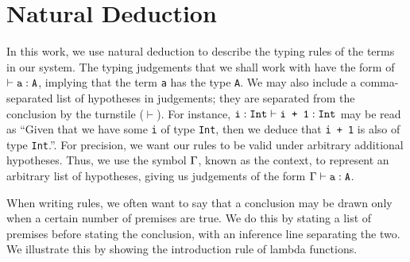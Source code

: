 \documentclass[12pt,twoside,maitrise]{dms}
\theoremstyle{definition}
\numberwithin{equation}{section}
\numberwithin{table}{chapter}
\numberwithin{figure}{chapter}
\newcommand\id[1] {\texttt{#1}}
\begin{document}




\def\bibname{References}






\anglais
\appendix

\chapter{Natural Deduction}\label{app:natural-deduction}

In this work, we use natural deduction to describe the typing rules of the
terms in our system. The typing judgements that we shall work with have the
form of $\vdash \oftype{\id{a}}{\id{A}}$, implying that the term \id{a} has the
type \id{A}. We may also include a comma-separated list of hypotheses in
judgements; they are separated from the conclusion by the turnstile ($\vdash$).
For instance, $\oftype{\oftype{\id{i}}{\id{Int}}}{\id{i + 1}}{\id{Int}}$ may be
read as ``Given that we have some \id{i} of type \id{Int}, then we deduce that
\id{i + 1} is also of type \id{Int}.''. For precision, we want our rules to
be valid under arbitrary additional hypotheses. Thus, we use the symbol $\Gamma$,
known as the context, to represent an arbitrary list of hypotheses, giving us
judgements of the form $\oftype{\ctx}{\id{a}}{\id{A}}$.

When writing rules, we often want to say that a conclusion may be drawn only
when a certain number of premises are true. We do this by stating a list of
premises before stating the conclusion, with an inference line separating the
two. We illustrate this by showing the introduction rule of lambda functions.

\begin{prooftree*}
   \hypo{\oftype{\ctx, \oftype{\id{a}}{\id{A}}}{\id{b}}{\id{B}}}
   \infer1{\oftype{\ctx}{\lambda (\id{a} : \id{A}) \rightarrow \id{b}}{\id{A} \rightarrow \id{B}}}
\end{prooftree*}
\end{document}

